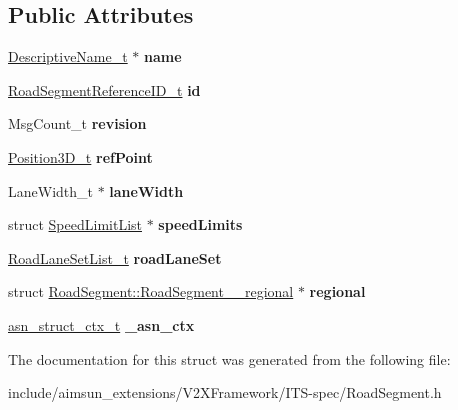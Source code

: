 \subsection*{Public Attributes}
\begin{DoxyCompactItemize}
\item 
\hyperlink{structOCTET__STRING}{Descriptive\+Name\+\_\+t} $\ast$ {\bfseries name}\hypertarget{structRoadSegment_a33d617c3835782f04ba6a97704b0443f}{}\label{structRoadSegment_a33d617c3835782f04ba6a97704b0443f}

\item 
\hyperlink{structRoadSegmentReferenceID}{Road\+Segment\+Reference\+I\+D\+\_\+t} {\bfseries id}\hypertarget{structRoadSegment_a2050ec214ab6c120a6dba7384017c898}{}\label{structRoadSegment_a2050ec214ab6c120a6dba7384017c898}

\item 
Msg\+Count\+\_\+t {\bfseries revision}\hypertarget{structRoadSegment_af3d49b307c0d7ff94138ec863dd344ce}{}\label{structRoadSegment_af3d49b307c0d7ff94138ec863dd344ce}

\item 
\hyperlink{structPosition3D}{Position3\+D\+\_\+t} {\bfseries ref\+Point}\hypertarget{structRoadSegment_ac5df5c32efd918ed25f5dfdb5cddf587}{}\label{structRoadSegment_ac5df5c32efd918ed25f5dfdb5cddf587}

\item 
Lane\+Width\+\_\+t $\ast$ {\bfseries lane\+Width}\hypertarget{structRoadSegment_afb79d3420fe2b780dec7a4a5de2e7800}{}\label{structRoadSegment_afb79d3420fe2b780dec7a4a5de2e7800}

\item 
struct \hyperlink{structSpeedLimitList}{Speed\+Limit\+List} $\ast$ {\bfseries speed\+Limits}\hypertarget{structRoadSegment_aaa2803b700ac92f210a76b52588e5a34}{}\label{structRoadSegment_aaa2803b700ac92f210a76b52588e5a34}

\item 
\hyperlink{structRoadLaneSetList}{Road\+Lane\+Set\+List\+\_\+t} {\bfseries road\+Lane\+Set}\hypertarget{structRoadSegment_aa7cf146e9e2e016664e66f2b9ec788e5}{}\label{structRoadSegment_aa7cf146e9e2e016664e66f2b9ec788e5}

\item 
struct \hyperlink{structRoadSegment_1_1RoadSegment____regional}{Road\+Segment\+::\+Road\+Segment\+\_\+\+\_\+regional} $\ast$ {\bfseries regional}\hypertarget{structRoadSegment_adc4db68bbd27a22fbfa84c0ae80b152e}{}\label{structRoadSegment_adc4db68bbd27a22fbfa84c0ae80b152e}

\item 
\hyperlink{structasn__struct__ctx__s}{asn\+\_\+struct\+\_\+ctx\+\_\+t} {\bfseries \+\_\+asn\+\_\+ctx}\hypertarget{structRoadSegment_ac04bb065b1c2260734cf78592a6ddbbc}{}\label{structRoadSegment_ac04bb065b1c2260734cf78592a6ddbbc}

\end{DoxyCompactItemize}


The documentation for this struct was generated from the following file\+:\begin{DoxyCompactItemize}
\item 
include/aimsun\+\_\+extensions/\+V2\+X\+Framework/\+I\+T\+S-\/spec/Road\+Segment.\+h\end{DoxyCompactItemize}
